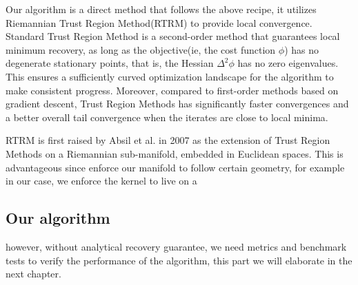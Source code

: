 Our algorithm is a direct method that follows the above recipe, it utilizes Riemannian Trust Region Method(RTRM) to provide local convergence. Standard Trust Region Method is a second-order method that guarantees local minimum recovery, as long as the objective(ie, the cost function $\phi$) has no degenerate stationary points, that is, the Hessian $\Delta^2\phi$ has no zero eigenvalues. This ensures a sufficiently curved optimization landscape for the algorithm to make consistent progress. Moreover, compared to first-order methods based on gradient descent, Trust Region Methods has significantly faster convergences and a better overall tail convergence when the iterates are close to local minima. 

\ac{RTRM} is first raised by Absil et al. in 2007 as the extension of Trust Region Methods on a Riemannian sub-manifold, embedded in Euclidean spaces. This is advantageous since enforce our manifold to follow certain geometry, for example in our case, we enforce the kernel to live on a 


\subsection{Our algorithm}


however, without analytical recovery guarantee, we need metrics and benchmark tests to verify the performance of the algorithm, this part we will elaborate in the next chapter. 

